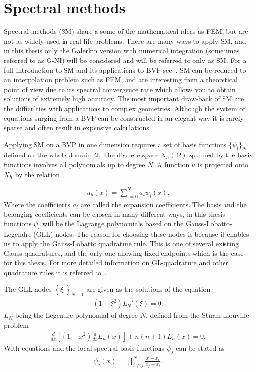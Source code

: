 
\section{Spectral methods}
Spectral methods (SM) share a some of the mathematical ideas as FEM, but are not as widely used in real life problems. 
There are many ways to apply SM, 
and in this thesis only the Galerkin version with numerical integration (sometimes referred to as G-NI) will be considered and will be referred to only as SM. 
For a full introduction to SM and its applications to BVP see~\cite{Canuto}.
SM can be reduced to an interpolation problem such as FEM, and are interesting from a theoretical point of view due to its 
spectral convergence rate which allows you to obtain solutions of extremely high accuracy. 
The most important draw-back of SM are the difficulties with applications to complex geometries. Although the system of equations surging from
a BVP can be constructed in an elegant way it is rarely sparse and often result in expensive calculations. 

Applying SM on a BVP in one dimension requires a set of basis functions $\{\psi_i\}_N$ defined on the whole domain $\Omega$. 
The discrete space $X_h(\Omega)$ spanned by the basis functions involves all polynomials up to degree $N$.
A function $u$ is projected onto $X_h$ by the relation

\begin{align}
    u_h(x) = \sum_{i=0}^N a_i\psi_i(x).
    \label{eq:spectralprojection}
\end{align}
Where the coefficients $a_i$ are called the expansion coefficients. The basis and the belonging coefficients can be chosen in many different ways, 
in this thesis functions $\psi_i$ will be the Lagrange polynomials based on the Gauss-Lobatto-Legendre (GLL) nodes. 
The reason for choosing these nodes is because it enables us to apply the Gauss-Lobatto quadrature 
rule. This is one of several existing Gauss-quadratures, and the only one allowing fixed 
endpoints which is the case for this thesis. For more detailed information on GL-quadrature and 
other quadrature rules it is referred to~\cite{SM}.

The GLL-nodes $\left\{ \xi_i \right\}_{N+1}$ are given as the solutions of the equation 
\begin{align}
    (1-\xi^2)L_N'(\xi) = 0.
    \label{eq:GLL-nodes}
\end{align}
$L_N$ being the Legendre polynomial of degree $N$, defined from the Sturm-Liouville problem
\begin{align}
    \frac{d}{dx}\left[  (1-x^2)\frac{d}{dx}L_n(x)\right]+n(n+1)L_n(x) = 0.
    \label{eq:Legendre}
\end{align}
With equations  and  the local spectral 
basis functions $\psi_j$ can be stated as 
\begin{align}
    \psi_j(x) = \prod_{i\neq j}^{N}\frac{x-x_i}{x_j-x_i}.
    \label{eq:Lagrange}
\end{align}

